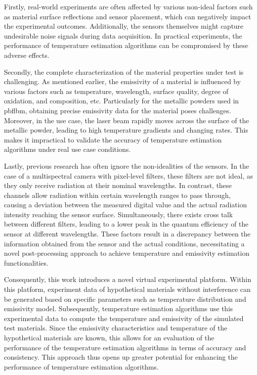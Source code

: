 Firstly, real-world experiments are often affected by various non-ideal 
factors such as material surface reflections and sensor placement, 
which can negatively impact the experimental outcomes. Additionally, the 
sensors themselves might capture undesirable noise signals during data 
acquisition. In practical experiments, the performance of 
temperature estimation algorithms can be compromised by these adverse effects.


Secondly, the complete characterization of the material properties under 
test is challenging. As mentioned earlier, the emissivity of a material is 
influenced by various factors such as temperature, wavelength, surface 
quality, degree of oxidation, and composition, etc. Particularly for the 
metallic powders used in \gls{pbflbm}, obtaining precise emissivity data 
for the material poses challenges. Moreover, in the use case, 
the laser beam rapidly moves across the surface of the metallic powder, 
leading to high temperature gradients and changing rates. This makes it 
impractical to validate the accuracy of temperature estimation algorithms 
under real use case conditions.

Lastly, previous research has often ignore the non-idealities of the 
sensors. In the case of a multispectral camera with pixel-level filters, 
these filters are not ideal, as they only receive radiation at their 
nominal wavelengths. In contrast, these channels allow radiation within 
certain wavelength ranges to pass through, causing a deviation between 
the measured digital value and the actual radiation intensity reaching 
the sensor surface. Simultaneously, there exists cross talk between 
different filters, leading to a lower peak in the quantum efficiency of 
the sensor at different wavelengths. These factors result in a discrepancy 
between the information obtained from the sensor and the actual conditions, 
necessitating a novel post-processing approach to achieve temperature and 
emissivity estimation functionalities.


Consequently, this work introduces a novel virtual experimental platform. 
Within this platform, experiment data of hypothetical materials without 
interference can be generated based on specific parameters such as 
temperature distribution and emissivity model. Subsequently, temperature 
estimation algorithms use this experimental data to compute the 
temperature and emissivity of the simulated test materials. 
Since the emissivity characteristics and temperature of the hypothetical 
materials are known, this allows for an evaluation of the performance 
of the temperature estimation algorithms in terms of accuracy and 
consistency. This approach thus opens up greater potential for 
enhancing the performance of temperature estimation algorithms.




